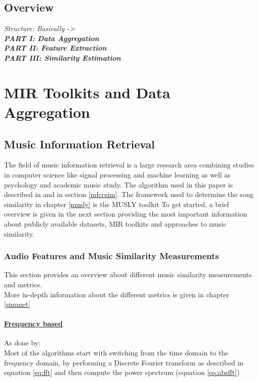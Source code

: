 \section{Overview}

\textit{Structure: 
Basically ->\\
\textbf{PART I: Data Aggregation\\
PART II: Feature Extraction\\
PART III: Similarity Estimation}
}

\chapter{MIR Toolkits and Data Aggregation}

\section{Music Information Retrieval}
The field of music information retrieval is a large research area combining studies in computer science like signal processing and machine learning as well as psychology and academic music study.
The algorithm used in this paper is described in \cite[pp. 17ff]{schnitzer1} and in section \ref{mfccsim}.
The framework used to determine the song similarity in chapter \ref{musly} is the MUSLY toolkit \cite{musly1}
To get started, a brief overview is given in the next section providing the most important information about publicly available datasets, MIR toolkits and approaches to music similarity.

\subsection{Audio Features and Music Similarity Measurements}

This section provides an overview about different music similarity measurements and metrics.\\
More in-depth information about the different metrics is given in chapter \ref{simmet}

\subsubsection{\underline{Frequency based}}\label{featsec}

As done by: \cite[pp. 17ff]{schnitzer1}\\
Most of the algorithms start with switching from the time domain to the frequency domain, by performing a Discrete Fourier transform as described in equation \ref{eq:fft} and then compute the power spectrum (equation \ref{eq:absfft})


